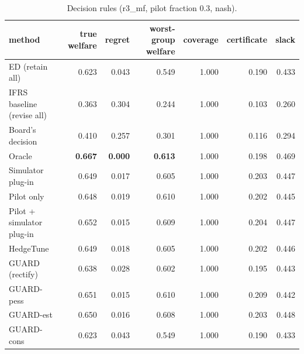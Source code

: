 \begin{table}[t]
\centering
\small
\begin{tabular}{lrrrrrr}
\toprule
method & true welfare & regret & worst-group welfare & coverage & certificate & slack \\
\midrule
ED (retain all) & 0.623 & 0.043 & 0.549 & 1.000 & 0.190 & 0.433 \\
IFRS baseline (revise all) & 0.363 & 0.304 & 0.244 & 1.000 & 0.103 & 0.260 \\
Board's decision & 0.410 & 0.257 & 0.301 & 1.000 & 0.116 & 0.294 \\
Oracle & \textbf{0.667} & \textbf{0.000} & \textbf{0.613} & 1.000 & 0.198 & 0.469 \\
Simulator plug-in & 0.649 & 0.017 & 0.605 & 1.000 & 0.203 & 0.447 \\
Pilot only & 0.648 & 0.019 & 0.610 & 1.000 & 0.202 & 0.445 \\
Pilot + simulator plug-in & 0.652 & 0.015 & 0.609 & 1.000 & 0.204 & 0.447 \\
HedgeTune & 0.649 & 0.018 & 0.605 & 1.000 & 0.202 & 0.446 \\
GUARD (rectify) & 0.638 & 0.028 & 0.602 & 1.000 & 0.195 & 0.443 \\
GUARD-pess & 0.651 & 0.015 & 0.610 & 1.000 & 0.209 & 0.442 \\
GUARD-est & 0.650 & 0.016 & 0.608 & 1.000 & 0.203 & 0.448 \\
GUARD-cons & 0.623 & 0.043 & 0.549 & 1.000 & 0.190 & 0.433 \\
\bottomrule
\end{tabular}
\caption{Decision rules (r3\_mf, pilot fraction 0.3, nash).}
\label{tab:methods-nash}
\end{table}
